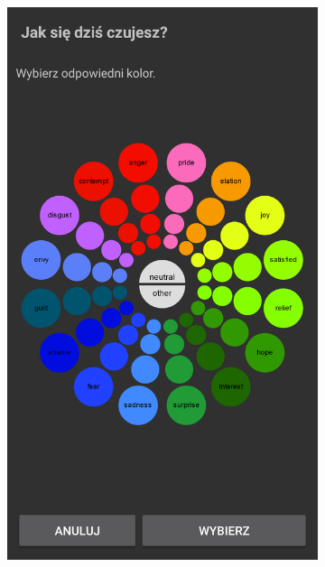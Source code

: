 \begin{itemize}
	\begin{figure}[H]
		\centering
		\begin{subfigure}{0.35\textwidth}
			\centering
			\includegraphics[scale=0.22]{rozdzial6/jspsych-geneva-wheel.png}
			\subcaption{\label{subfigure_a}}
		\end{subfigure}
		\begin{subfigure}{0.35\textwidth}
			\centering

\end{subfigure}
\end{figure}
\end{itemize}
